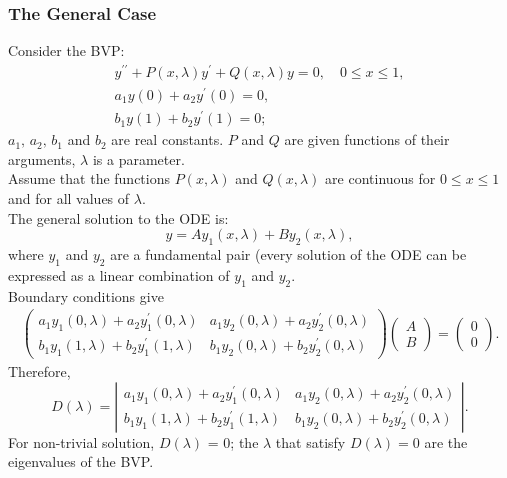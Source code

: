 \documentclass{article}
\begin{document}
\subsubsection{The General Case}
Consider the BVP:
\begin{align}
    y^{\prime\prime}+P(x,\lambda)y^\prime + Q(x,\lambda)y=0,\quad 0\leq x\leq 1, \\
    a_1y(0) + a_2y^\prime(0) = 0, \\
    b_1y(1) + b_2y^\prime(1) = 0;
\end{align}
$a_1,\,a_2,\,b_1$ and $b_2$ are real constants. $P$ and $Q$ are given functions of their arguments, $\lambda$ is a parameter.\\
Assume that the functions $P(x,\lambda)$ and $Q(x,\lambda)$ are continuous for $0\leq x\leq 1$ and for all values of $\lambda$.\\
The general solution to the ODE is:
\begin{equation}
    y = Ay_1(x,\lambda) + By_2(x,\lambda),\nonumber    
\end{equation}
where $y_1$ and $y_2$ are a fundamental pair (every solution of the ODE can be expressed as a linear combination of $y_1$ and $y_2$.\\
Boundary conditions give
\begin{align}
    \begin{pmatrix}
    a_1y_1(0,\lambda) + a_2y^\prime_1(0,\lambda) & a_1y_2(0,\lambda) + a_2y^\prime_2(0,\lambda) \\
    b_1y_1(1,\lambda) + b_2y^\prime_1(1,\lambda) & b_1y_2(0,\lambda) + b_2y^\prime_2(0,\lambda)
    \end{pmatrix}
    \begin{pmatrix}
    A \\ B
    \end{pmatrix}
    =
    \begin{pmatrix}
    0 \\ 0
    \end{pmatrix}.
\end{align}
Therefore,
\begin{equation}
    D(\lambda) = \left\lvert \begin{array}{cc}
         a_1y_1(0,\lambda) + a_2y^\prime_1(0,\lambda) & a_1y_2(0,\lambda) + a_2y^\prime_2(0,\lambda) \\
        b_1y_1(1,\lambda) + b_2y^\prime_1(1,\lambda) & b_1y_2(0,\lambda) + b_2y^\prime_2(0,\lambda)
    \end{array} \right\rvert.
\end{equation}
For non-trivial solution, $D(\lambda)$ = 0; the $\lambda$ that satisfy $D(\lambda)=0$ are the eigenvalues of the BVP.
\end{document}
